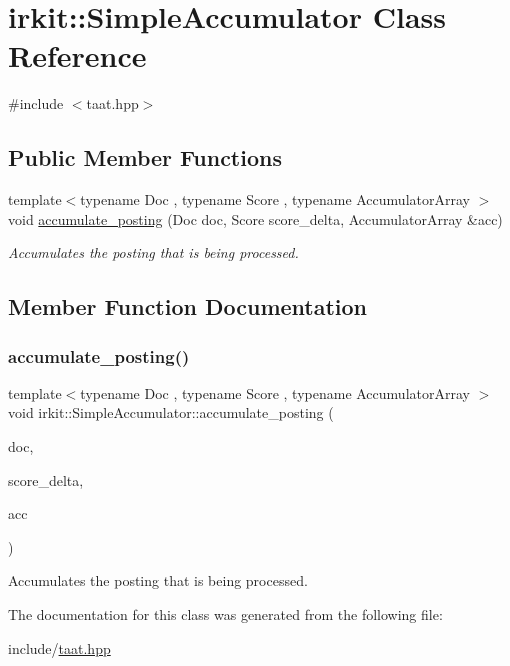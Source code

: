 \hypertarget{classirkit_1_1SimpleAccumulator}{}\section{irkit\+:\+:Simple\+Accumulator Class Reference}
\label{classirkit_1_1SimpleAccumulator}


{\ttfamily \#include $<$taat.\+hpp$>$}

\subsection*{Public Member Functions}
\begin{DoxyCompactItemize}
\item 
{\footnotesize template$<$typename Doc , typename Score , typename Accumulator\+Array $>$ }\\void \hyperlink{classirkit_1_1SimpleAccumulator_af747d80dbebe394e3ebe920afeeac810}{accumulate\+\_\+posting} (Doc doc, Score score\+\_\+delta, Accumulator\+Array \&acc)
\begin{DoxyCompactList}\small\item\em Accumulates the posting that is being processed. \end{DoxyCompactList}\end{DoxyCompactItemize}


\subsection{Member Function Documentation}
\mbox{\label{classirkit_1_1SimpleAccumulator_af747d80dbebe394e3ebe920afeeac810}} 
\subsubsection{\texorpdfstring{accumulate\+\_\+posting()}{accumulate\_posting()}}
{\footnotesize\ttfamily template$<$typename Doc , typename Score , typename Accumulator\+Array $>$ \\
void irkit\+::\+Simple\+Accumulator\+::accumulate\+\_\+posting (\begin{DoxyParamCaption}\item[{Doc}]{doc,  }\item[{Score}]{score\+\_\+delta,  }\item[{Accumulator\+Array \&}]{acc }\end{DoxyParamCaption})\hspace{0.3cm}{\ttfamily [inline]}}



Accumulates the posting that is being processed. 



The documentation for this class was generated from the following file\+:\begin{DoxyCompactItemize}
\item 
include/\hyperlink{taat_8hpp}{taat.\+hpp}\end{DoxyCompactItemize}
